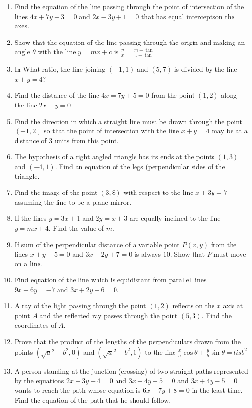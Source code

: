 \documentclass{article}
\theoremstyle{remark}
\begin{document}
\begin{enumerate}
\item Find the equation of the line passing through the point of intersection of the lines $4x+7y-3=0$ and $2x-3y+1=0$ that has equal interceptson the axes.
\item Show that the equation of the line passing through the origin and making an angle $\theta$ with the line $y=mx+c$ is $\frac {y}{x}=\frac {m\pm \tan}{1\mp \tan}$
\item In What ratio, the line joining $(-1,1)$ and $(5,7)$ is divided by the line $x+y=4$?
\item Find the distance of the line $4x=7y+5=0$ from the point $(1,2)$ along the line $2x-y=0$.
\item Find the direction in which a straight line must be  drawn through the point $(-1,2)$ so that the point of intersection with the line $x+y=4$ may be at a distance of $3$ units from this point.
\item The hypothesis of a right angled triangle has its ends at the points $(1,3)$ and $(-4,1)$. Find an equation of the legs (perpendicular sides of the triangle.
\item Find the image of the point $(3,8)$ with respect to the line $x+3y=7$ assuming the line to be a plane mirror.
\item If the lines $y= 3x+1$ and $2y= x+3$ are equally inclined to the line $y= mx+4$. Find the value of $m$.
\item If sum of the perpendicular distance of a variable point $P(x,y)$ from the lines $x+y-5=0$ and $3x-2y+7=0$ is always $10$. Show that $P$ must move on a line.
\item Find equation of the line which is equidistant from parallel lines $9x+6y=-7$ and $3x+2y+6=0$.
\item A ray of the light passing through the point $(1,2)$ reflects on the $x$ axis at point $A$ and the reflected ray passes through the point $(5,3)$. Find the coordinates of $A$.
\item Prove that the product of the lengths of the perpendiculars drawn from the points $(\sqrt a^2-b^2, 0)$ and $(\sqrt a^2-b^2, 0)$ to the line $\frac{x}{a} \cos \theta + \frac{y}{b} \sin \theta = lis b^2$
\item A person standing at the junction (crossing) of two straight paths represented by the equations $2x-3y+4=0$ and $3x+4y-5 = 0$ and $3x+4y-5= 0 $ wants to reach the path whose equation is $6x-7y+8=0$ in the least time. Find the equation of the path that he should follow.
\end{enumerate}
\end{document}
